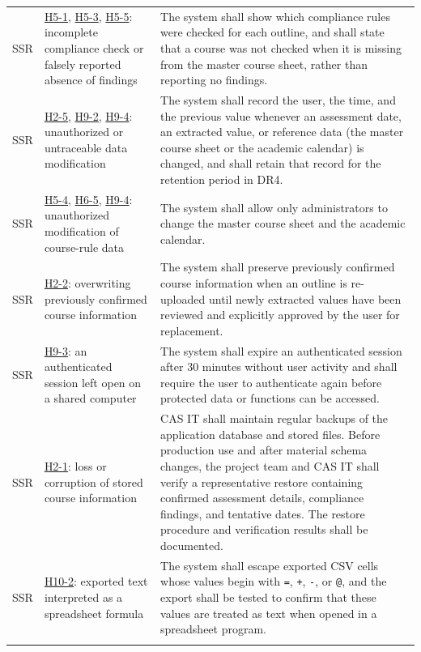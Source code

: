 \documentclass{article}
\newcounter{ssrnum} %
\newcommand{\ssrthessrnum}{SSR\thessrnum}
\newcommand{\hazref}[1]{\hyperref[haz:#1]{#1}}
\begin{document}
\begin{table}[H]
\begin{tabularx}{\textwidth}{>{\raggedright\arraybackslash}p{}
  >{\raggedright\arraybackslash}p{}
  >{\raggedright\arraybackslash}X}
\leavevmode{}{ssrnum}\ssrthessrnum \label{SSR_CheckCoverage} & \hazref{H5-1}, \hazref{H5-3}, \hazref{H5-5}: incomplete compliance check or falsely reported absence of findings & The system shall show which compliance rules were checked for each outline, and shall state that a course was not checked when it is missing from the master course sheet, rather than reporting no findings.\\ \addlinespace
\leavevmode{}{ssrnum}\ssrthessrnum \label{SSR_AuditTrail} & \hazref{H2-5}, \hazref{H9-2}, \hazref{H9-4}: unauthorized or untraceable data modification & The system shall record the user, the time, and the previous value whenever an assessment date, an extracted value, or reference data (the master course sheet or the academic calendar) is changed, and shall retain that record for the retention period in DR4.\\ \addlinespace
\leavevmode{}{ssrnum}\ssrthessrnum \label{SSR_MasterSheetEdit} & \hazref{H5-4}, \hazref{H6-5}, \hazref{H9-4}: unauthorized modification of course-rule data & The system shall allow only administrators to change the master course sheet and the academic calendar.\\
\leavevmode{}{ssrnum}\ssrthessrnum \label{SSR_ConfirmedDataPreservation} & \hazref{H2-2}: overwriting previously confirmed course information & The system shall preserve previously confirmed course information when an outline is re-uploaded until newly extracted values have been reviewed and explicitly approved by the user for replacement.\\
\leavevmode{}{ssrnum}\ssrthessrnum \label{SSR_SessionTimeout} & \hazref{H9-3}: an authenticated session left open on a shared computer & The system shall expire an authenticated session after 30 minutes without user activity and shall require the user to authenticate again before protected data or functions can be accessed.\\
\leavevmode{}{ssrnum}\ssrthessrnum \label{SSR_BackupRestore} & \hazref{H2-1}: loss or corruption of stored course information & CAS IT shall maintain regular backups of the application database and stored files. Before production use and after material schema changes, the project team and CAS IT shall verify a representative restore containing confirmed assessment details, compliance findings, and tentative dates. The restore procedure and verification results shall be documented.\\ \addlinespace
\leavevmode{}{ssrnum}\ssrthessrnum \label{SSR_CSVExport} & \hazref{H10-2}: exported text interpreted as a spreadsheet formula & The system shall escape exported CSV cells whose values begin with \texttt{=}, \texttt{+}, \texttt{-}, or \texttt{@}, and the export shall be tested to confirm that these values are treated as text when opened in a spreadsheet program.\\ \addlinespace

\end{tabularx}
\end{table}
\end{document}
